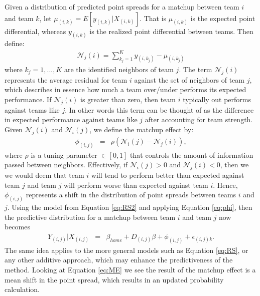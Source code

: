 \documentclass[letterpaper,12pt]{article}
\begin{document}
Given a distribution of predicted point spreads for a matchup between team $i$ and team $k$, let $\mu_{(i,k)} = E[y_{(i,k)}|X_{(i,k)}]$. That is $\mu_{(i,k)}$ is the expected point differential, whereas $y_{(i,k)}$ is the realized point differential between teams. Then define:
\begin{eqnarray*}
\mathcal{N}_j(i) = \sum_{k_j=1}^K y_{(i,k_j)} - \mu_{(i,k_j)}
\end{eqnarray*}
where $k_j = 1,...,K$ are the identified neighbors of team $j$. The term $\mathcal{N}_j(i)$ represents the average residual for team $i$ against the set of neighbors of team $j$, which describes in essence how much a team over/under performs its expected performance. If $\mathcal{N}_j(i)$ is greater than zero, then team $i$ typically out performs against teams like $j$. In other words this term can be thought of as the difference in expected performance against teams like $j$ after accounting for team strength. Given $\mathcal{N}_j(i)$ and $\mathcal{N}_i(j)$, we define the matchup effect by:
\begin{eqnarray}
\phi_{(i,j)} &=& \rho(\mathcal{N}_i(j) -\mathcal{N}_j(i)),\label{eq:phi}
\end{eqnarray}
where $\rho$ is a tuning parameter $\in [0,1]$ that controls the amount of information passed between neighbors. Effectively, if $\mathcal{N}_i(j) >0$ and $\mathcal{N}_j(i)<0$, then we we would deem that team $i$ will tend to perform better than expected against team $j$ and team $j$ will perform worse than expected against team $i$. Hence, $\phi_{(i,j)}$ represents a shift in the distribution of point spreads between teams $i$ and $j$. Using the model from Equation \ref{eq:RS2} and applying Equation \ref{eq:phi}, then the predictive distribution for a matchup between team $i$ and team $j$ now becomes
\begin{eqnarray}
Y_{(i,j)}|X_{(i,j)} &=& \beta_{home} +  D_{(i,j)}\beta + \phi_{(i,j)} +  \epsilon_{(i,j)k} \label{eq:ME}.
\end{eqnarray}
The same idea applies to the more general models such as Equation \ref{eq:RS}, or any other additive approach, which may enhance the predictiveness of the method. Looking at Equation \ref{eq:ME} we see the result of the matchup effect is a mean shift in the point spread, which results in an updated probability calculation.
\end{document}
